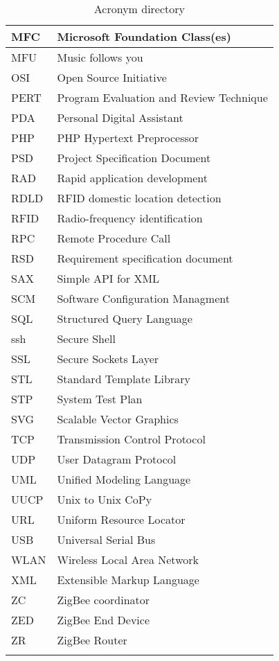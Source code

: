 \begin{center}
\begin{longtable}{|ll|}
   \hline
    MFC		& Microsoft Foundation Class(es)\\
   \hline
    MFU		& Music follows you\\
   \hline
    OSI		& Open Source Initiative\\
   \hline
    PERT	& Program Evaluation and Review Technique\\
   \hline
    PDA		& Personal Digital Assistant\\
   \hline
    PHP		& PHP Hypertext Preprocessor\\
   \hline
    PSD		& Project Specification Document\\
   \hline
    RAD		& Rapid application development\\
   \hline
    RDLD	& RFID domestic location detection\\
   \hline
    RFID	& Radio-frequency identification\\
   \hline
    RPC		& Remote Procedure Call\\
   \hline
    RSD		& Requirement specification document\\
   \hline
    SAX		& Simple API for XML\\
   \hline
    SCM		& Software Configuration Managment\\
   \hline
    SQL		& Structured Query Language\\
   \hline
    ssh		& Secure Shell\\
   \hline
    SSL		& Secure Sockets Layer\\
   \hline
    STL		& Standard Template Library\\
   \hline
    STP		& System Test Plan\\
   \hline
    SVG		& Scalable Vector Graphics\\
   \hline
    TCP		& Transmission Control Protocol\\
   \hline
    UDP		& User Datagram Protocol\\
   \hline
    UML		& Unified Modeling Language\\
   \hline
    UUCP	& Unix to Unix CoPy\\
   \hline
    URL		& Uniform Resource Locator\\
   \hline
    USB		& Universal Serial Bus\\
   \hline
    WLAN	& Wireless Local Area Network\\
   \hline
    XML		& Extensible Markup Language\\
   \hline
    ZC		& ZigBee coordinator\\
   \hline
    ZED		& ZigBee End Device\\
   \hline
    ZR		& ZigBee Router\\
   \hline
  \caption{Acronym directory}
 \end{longtable}
\end{center}
\newpage
